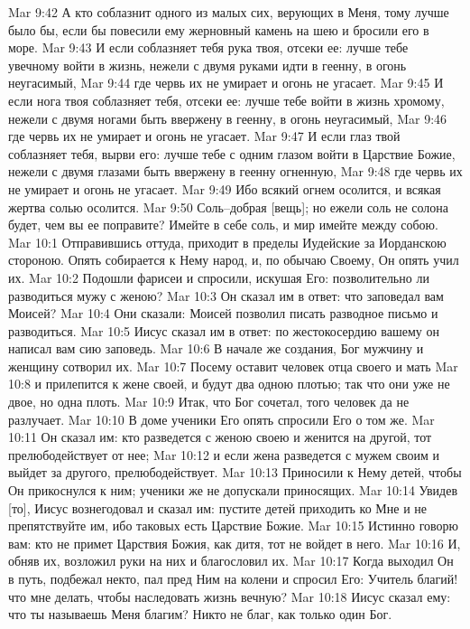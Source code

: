 Mar 9:42  А кто соблазнит одного из малых сих, верующих в Меня, тому лучше было бы, если бы повесили ему жерновный камень на шею и бросили его в море.
Mar 9:43  И если соблазняет тебя рука твоя, отсеки ее: лучше тебе увечному войти в жизнь, нежели с двумя руками идти в геенну, в огонь неугасимый,
Mar 9:44  где червь их не умирает и огонь не угасает.
Mar 9:45  И если нога твоя соблазняет тебя, отсеки ее: лучше тебе войти в жизнь хромому, нежели с двумя ногами быть ввержену в геенну, в огонь неугасимый,
Mar 9:46  где червь их не умирает и огонь не угасает.
Mar 9:47  И если глаз твой соблазняет тебя, вырви его: лучше тебе с одним глазом войти в Царствие Божие, нежели с двумя глазами быть ввержену в геенну огненную,
Mar 9:48  где червь их не умирает и огонь не угасает.
Mar 9:49  Ибо всякий огнем осолится, и всякая жертва солью осолится.
Mar 9:50  Соль--добрая [вещь]; но ежели соль не солона будет, чем вы ее поправите? Имейте в себе соль, и мир имейте между собою.
Mar 10:1  Отправившись оттуда, приходит в пределы Иудейские за Иорданскою стороною. Опять собирается к Нему народ, и, по обычаю Своему, Он опять учил их.
Mar 10:2  Подошли фарисеи и спросили, искушая Его: позволительно ли разводиться мужу с женою?
Mar 10:3  Он сказал им в ответ: что заповедал вам Моисей?
Mar 10:4  Они сказали: Моисей позволил писать разводное письмо и разводиться.
Mar 10:5  Иисус сказал им в ответ: по жестокосердию вашему он написал вам сию заповедь.
Mar 10:6  В начале же создания, Бог мужчину и женщину сотворил их.
Mar 10:7  Посему оставит человек отца своего и мать
Mar 10:8  и прилепится к жене своей, и будут два одною плотью; так что они уже не двое, но одна плоть.
Mar 10:9  Итак, что Бог сочетал, того человек да не разлучает.
Mar 10:10  В доме ученики Его опять спросили Его о том же.
Mar 10:11  Он сказал им: кто разведется с женою своею и женится на другой, тот прелюбодействует от нее;
Mar 10:12  и если жена разведется с мужем своим и выйдет за другого, прелюбодействует.
Mar 10:13  Приносили к Нему детей, чтобы Он прикоснулся к ним; ученики же не допускали приносящих.
Mar 10:14  Увидев [то], Иисус вознегодовал и сказал им: пустите детей приходить ко Мне и не препятствуйте им, ибо таковых есть Царствие Божие.
Mar 10:15  Истинно говорю вам: кто не примет Царствия Божия, как дитя, тот не войдет в него.
Mar 10:16  И, обняв их, возложил руки на них и благословил их.
Mar 10:17  Когда выходил Он в путь, подбежал некто, пал пред Ним на колени и спросил Его: Учитель благий! что мне делать, чтобы наследовать жизнь вечную?
Mar 10:18  Иисус сказал ему: что ты называешь Меня благим? Никто не благ, как только один Бог.
